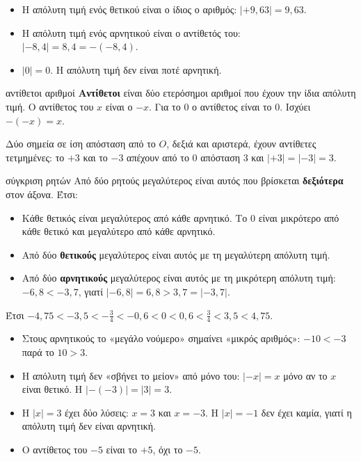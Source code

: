 \begin{itemize}[leftmargin=1.2em,itemsep=0.3ex,topsep=2pt]
\item Η απόλυτη τιμή ενός θετικού είναι ο ίδιος ο αριθμός: $|+9{,}63|=9{,}63$.
\item Η απόλυτη τιμή ενός αρνητικού είναι ο αντίθετός του: $|-8{,}4|=8{,}4=-(-8{,}4)$.
\item $|0|=0$. Η απόλυτη τιμή δεν είναι ποτέ αρνητική.
\end{itemize}

\begin{orismos}{αντίθετοι αριθμοί}
\textbf{Αντίθετοι} είναι δύο ετερόσημοι αριθμοί που έχουν την ίδια απόλυτη τιμή. Ο αντίθετος του $x$ είναι ο $-x$. Για το $0$ ο αντίθετος είναι το $0$. Ισχύει $-(-x)=x$.
\end{orismos}

Δύο σημεία σε ίση απόσταση από το $O$, δεξιά και αριστερά, έχουν αντίθετες τετμημένες: το $+3$ και το $-3$ απέχουν από το $0$ απόσταση $3$ και $|+3|=|-3|=3$.


\begin{kanonas}{σύγκριση ρητών}
Από δύο ρητούς μεγαλύτερος είναι αυτός που βρίσκεται \textbf{δεξιότερα} στον άξονα. Έτσι:
\begin{itemize}[leftmargin=1.2em,itemsep=0.3ex,topsep=2pt]
\item Κάθε θετικός είναι μεγαλύτερος από κάθε αρνητικό. Το $0$ είναι μικρότερο από κάθε θετικό και μεγαλύτερο από κάθε αρνητικό.
\item Από δύο \textbf{θετικούς} μεγαλύτερος είναι αυτός με τη μεγαλύτερη απόλυτη τιμή.
\item Από δύο \textbf{αρνητικούς} μεγαλύτερος είναι αυτός με τη μικρότερη απόλυτη τιμή: $-6{,}8<-3{,}7$, γιατί $|-6{,}8|=6{,}8>3{,}7=|-3{,}7|$.
\end{itemize}
\end{kanonas}

Έτσι $-4{,}75<-3{,}5<-\frac{3}{4}<-0{,}6<0<0{,}6<\frac{3}{4}<3{,}5<4{,}75$.

\begin{prosoxi}
\begin{itemize}[leftmargin=1.2em,itemsep=0.3ex,topsep=2pt]
\item Στους αρνητικούς το «μεγάλο νούμερο» σημαίνει «μικρός αριθμός»: $-10<-3$ παρά το $10>3$.
\item Η απόλυτη τιμή δεν «σβήνει το μείον» από μόνο του: $|-x|=x$ μόνο αν το $x$ είναι θετικό. Η $|-(-3)|=|3|=3$.
\item Η $|x|=3$ έχει δύο λύσεις: $x=3$ και $x=-3$. Η $|x|=-1$ δεν έχει καμία, γιατί η απόλυτη τιμή δεν είναι αρνητική.
\item Ο αντίθετος του $-5$ είναι το $+5$, όχι το $-5$.
\end{itemize}
\end{prosoxi}

